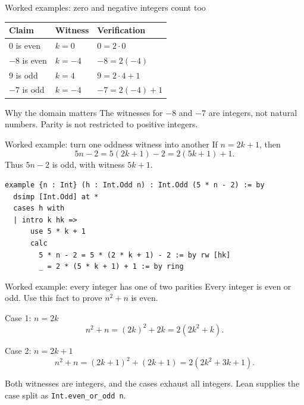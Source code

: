 \begin{frame}{Worked examples: zero and negative integers count too}
\begin{center}
\begin{tabular}{lll}
\toprule
Claim & Witness & Verification \\
\midrule
$0$ is even & $k=0$ & $0=2\cdot0$ \\
$-8$ is even & $k=-4$ & $-8=2(-4)$ \\
$9$ is odd & $k=4$ & $9=2\cdot4+1$ \\
$-7$ is odd & $k=-4$ & $-7=2(-4)+1$ \\
\bottomrule
\end{tabular}
\end{center}
\begin{block}{Why the domain matters}
The witnesses for $-8$ and $-7$ are integers, not natural numbers.
Parity is not restricted to positive integers.
\end{block}
\end{frame}

\begin{frame}[fragile]{Worked example: turn one oddness witness into another}
If $n=2k+1$, then
\[
5n-2=5(2k+1)-2=2(5k+1)+1.
\]
Thus $5n-2$ is odd, with witness $5k+1$.
\begin{lstlisting}
example {n : Int} (h : Int.Odd n) : Int.Odd (5 * n - 2) := by
  dsimp [Int.Odd] at *
  cases h with
  | intro k hk =>
      use 5 * k + 1
      calc
        5 * n - 2 = 5 * (2 * k + 1) - 2 := by rw [hk]
        _ = 2 * (5 * k + 1) + 1 := by ring
\end{lstlisting}
\end{frame}

\begin{frame}{Worked example: every integer has one of two parities}
Every integer is even or odd. Use this fact to prove $n^2+n$ is even.
\begin{block}{Case 1: $n=2k$}
\[
n^2+n=(2k)^2+2k=2(2k^2+k).
\]
\end{block}
\begin{block}{Case 2: $n=2k+1$}
\[
n^2+n=(2k+1)^2+(2k+1)=2(2k^2+3k+1).
\]
\end{block}
Both witnesses are integers, and the cases exhaust all integers.
Lean supplies the case split as \texttt{Int.even\_or\_odd n}.
\end{frame}

